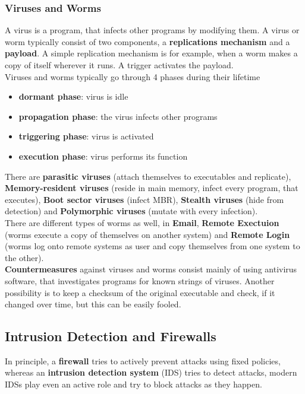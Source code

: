 \documentclass[a4paper, 10 pt, conference]{ieeeconf}
\begin{document}
\subsubsection{\textbf{Viruses and Worms}}
A virus is a program, that infects other programs by modifying them. A virus or worm typically consist of two components, a \textbf{replications mechanism} and a \textbf{payload}. A simple replication mechanism is for example, when a worm makes a copy of itself wherever it runs. A trigger activates the payload. \\
Viruses and worms typically go through 4 phases during their lifetime
\label{virusphase}
\begin{itemize}
\item \textbf{dormant phase}: virus is idle
\item \textbf{propagation phase}: the virus infects other programs
\item \textbf{triggering phase}: virus is activated
\item \textbf{execution phase}: virus performs its function
\end{itemize}
\label{viruses}
There are \textbf{parasitic viruses} (attach themselves to executables and replicate), \textbf{Memory-resident viruses} (reside in main memory, infect every program, that executes), \textbf{Boot sector viruses} (infect MBR), \textbf{Stealth viruses} (hide from detection) and \textbf{Polymorphic viruses} (mutate with every infection). \\
There are different types of worms as well, in \textbf{Email}, \textbf{Remote Exectuion} (worms execute a copy of themselves on another system) and \textbf{Remote Login} (worms log onto remote systems as user and copy themselves from one system to the other). \\
\textbf{Countermeasures} against viruses and worms consist mainly of using antivirus software, that investigates programs for known strings of viruses. Another possibility is to keep a checksum of the original executable and check, if it changed over time, but this can be easily fooled. 


\subsection{\textbf{Intrusion Detection and Firewalls}}
In principle, a \textbf{firewall} tries to actively prevent attacks using fixed policies, whereas an \textbf{intrusion detection system} (IDS) tries to detect attacks, modern IDSs play even an active role and try to block attacks as they happen. 
\vspace{0.5cm}
\end{document}
